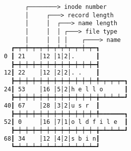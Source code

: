 \documentclass[varwidth,crop]{standalone}
\begin{document}
\begin{verbatim}
      ┌────────> inode number
      │     ┌───> record length
      │     │  ┌───> name length
      │     │  │ ┌───> file type
      │     │  │ │    ┌────> name
  ┏━┯━┿━┯━┯━┿━┯┷┯┷┯━┯━┿━┯━┓
0 ┃ 21    │12 │1│2│.      ┃
  ┣━┿━┿━┿━┿━┿━┿━┿━┿━┿━┿━┿━┫
12┃ 22    │12 │2│2│. .    ┃
  ┣━┿━┿━┿━┿━┿━┿━┿━┿━┿━┿━┿━╇━┯━┯━┯━┓
24┃ 53    │16 │5│2│h e l l o      ┃
  ┣━┿━┿━┿━┿━┿━┿━┿━┿━┿━┿━┿━╈━┷━┷━┷━┛
40┃ 67    │28 │3│2│u s r  ┃
  ┣━┿━┿━┿━┿━┿━┿━┿━┿━┿━┿━┿━╇━━━━━━━┓
52┃ 0     │16 │7│1│o l d f i l e  ┃
  ┣━┿━┿━┿━┿━┿━┿━┿━┿━┿━┿━┿━╈━┷━┷━┷━┛
68┃ 34    │12 │4│2│s b i n┃
  ┗━┷━┷━┷━┷━┷━┷━┷━┷━┷━┷━┷━┛
\end{verbatim}
\end{document}
